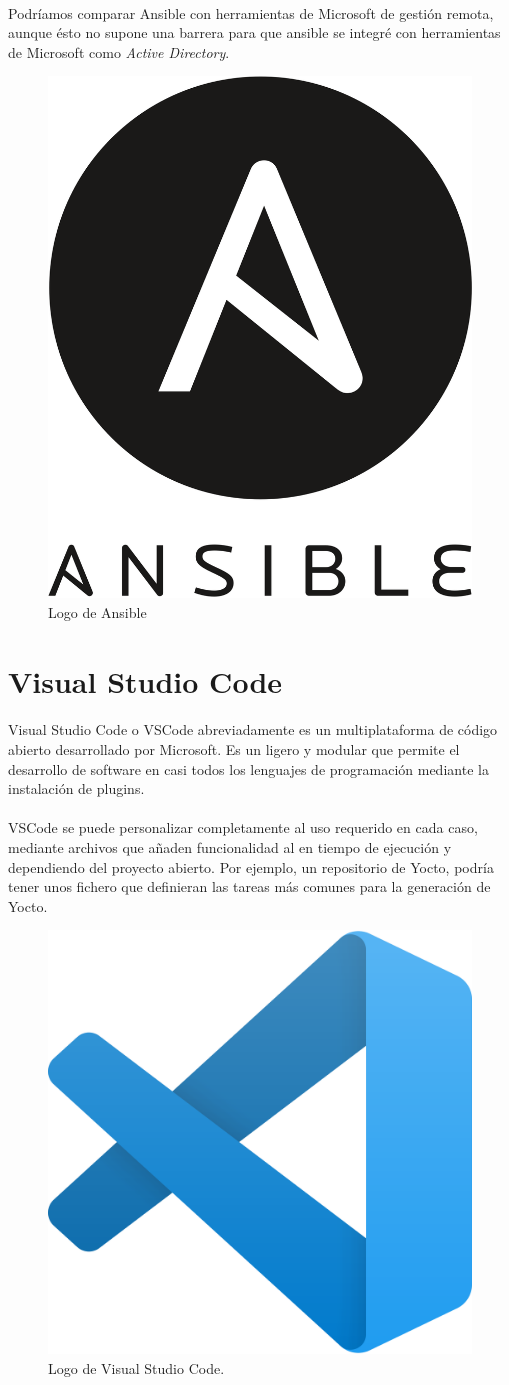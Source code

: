 \paragraph{}Podríamos comparar Ansible con herramientas de Microsoft de gestión remota,
aunque ésto no supone una barrera para que ansible se integré con herramientas de Microsoft
como \emph{Active Directory}.

\begin{figure}[H]
	\centering
	\includegraphics[width=0.30\linewidth]{imgs/ansible-logo}
	\caption[Ansible Logo]{Logo de Ansible}
	\label{fig:ansible}
\end{figure}

\section{Visual Studio Code}\label{sec:vscode}

\paragraph{}Visual Studio Code o VSCode abreviadamente es un  multiplataforma
de código abierto desarrollado por Microsoft. Es un  ligero y modular
que permite el desarrollo de software en casi todos los lenguajes de programación mediante
la instalación de \gls{plugins}.

\paragraph{}VSCode se puede personalizar completamente al uso requerido en cada caso,
mediante archivos que añaden funcionalidad al  en tiempo de ejecución
y dependiendo del proyecto abierto. Por ejemplo, un repositorio de Yocto, podría tener unos
fichero que definieran las tareas más comunes para la generación de Yocto.

\begin{figure}[H]
	\centering
	\includegraphics[width=0.30\linewidth]{imgs/vscode-logo}
	\caption[Visual Studio Code]{Logo de Visual Studio Code.}
	\label{fig:vscode-log}
\end{figure}

